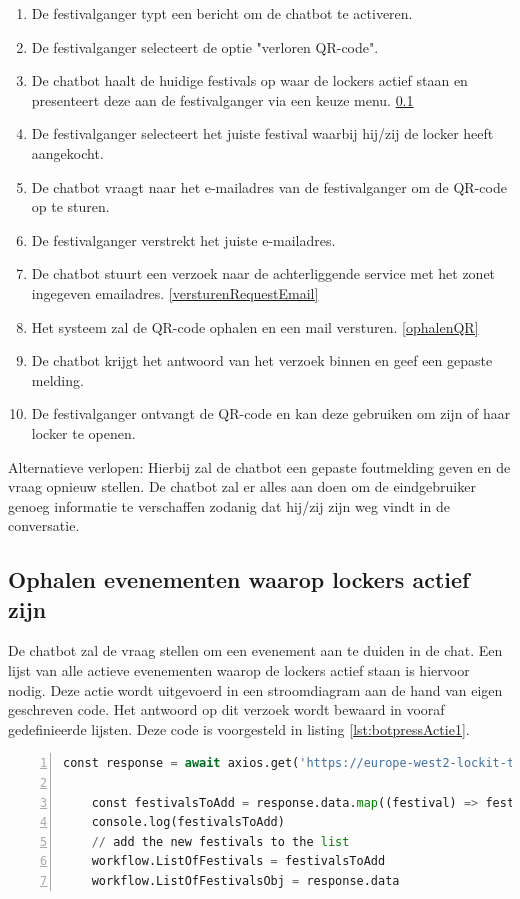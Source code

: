 \begin{enumerate}
    \item De festivalganger typt een bericht om de chatbot te activeren.
    \item De festivalganger selecteert de optie "verloren QR-code".
    \item De chatbot haalt de huidige festivals op waar de lockers actief staan en presenteert deze aan de festivalganger via een keuze menu. \ref{ophalenActieveFestivals}
    \item De festivalganger selecteert het juiste festival waarbij hij/zij de locker heeft aangekocht.
    \item De chatbot vraagt naar het e-mailadres van de festivalganger om de QR-code op te sturen.
    \item De festivalganger verstrekt het juiste e-mailadres.
    \item De chatbot stuurt een verzoek naar de achterliggende service met het zonet ingegeven emailadres. \ref{versturenRequestEmail}
    \item Het systeem zal de QR-code ophalen en een mail versturen. \ref{ophalenQR}
    \item De chatbot krijgt het antwoord van het verzoek binnen en geef een gepaste melding.
    \item De festivalganger ontvangt de QR-code en kan deze gebruiken om zijn of haar locker te openen.
\end{enumerate}

Alternatieve verlopen:
\newline
Hierbij zal de chatbot een gepaste foutmelding geven en de vraag opnieuw stellen. De chatbot zal er alles aan doen om de eindgebruiker genoeg informatie te verschaffen zodanig dat hij/zij zijn weg vindt in de conversatie.

\subsection{Ophalen evenementen waarop lockers actief zijn}
\label{ophalenActieveFestivals}
De chatbot zal de vraag stellen om een evenement aan te duiden in de chat. Een lijst van alle actieve evenementen waarop de lockers actief staan is hiervoor nodig. Deze actie wordt uitgevoerd in een stroomdiagram aan de hand van eigen geschreven code. Het antwoord op dit verzoek wordt bewaard in vooraf gedefinieerde lijsten. Deze code is voorgesteld in listing \ref{lst:botpressActie1}.

\begin{lstlisting}[language=Python, caption={Code blok geschreven in javascript om een actie van botpress uit te voeren.}, label=lst:botpressActie1, numbers=left]
    const response = await axios.get('https://europe-west2-lockit-testing.cloudfunctions.net/getActiveShops')
    
    const festivalsToAdd = response.data.map((festival) => festival.name)
    console.log(festivalsToAdd)
    // add the new festivals to the list
    workflow.ListOfFestivals = festivalsToAdd
    workflow.ListOfFestivalsObj = response.data
\end{lstlisting}

